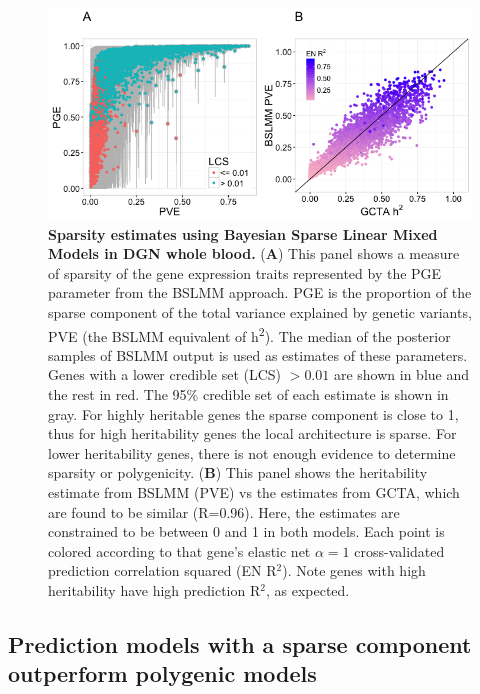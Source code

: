 \documentclass[10pt,letterpaper]{article}
\begin{document}
\begin{figure}[H]
\includegraphics[width=12cm]{Figures/Fig-DGN-BSLMM.png}
\caption{{\bf Sparsity estimates using Bayesian Sparse Linear Mixed Models in DGN whole blood.} 
(\textbf{A}) This panel shows a measure of sparsity of the gene expression traits represented by the PGE parameter from the BSLMM approach. PGE is the proportion of the sparse component of the total variance explained by genetic variants, PVE (the BSLMM equivalent of h\textsuperscript{2}). The median of the posterior samples of BSLMM output is used as estimates of these parameters.
Genes with a lower credible set (LCS) $>0.01$ are shown in blue and the rest in red. The 95\% credible set of each estimate is shown in gray. 
 For highly heritable genes the sparse component is close to 1, thus for high heritability genes the local architecture is sparse. For lower heritability genes, there is not enough evidence to determine sparsity or polygenicity. (\textbf{B}) This panel shows the heritability estimate from BSLMM (PVE) vs the estimates from GCTA, which are found to be similar (R=0.96). Here, the estimates are constrained to be between 0 and 1 in both models. Each point is colored according to that gene's elastic net \(\alpha=1\) cross-validated prediction correlation squared (EN R$^2$). Note genes with high heritability have high prediction R$^2$, as expected.
}
\label{fig-dgn-bslmm}
\end{figure}


\subsection*{Prediction models with a sparse component outperform polygenic models}\label{the-effect-of-local-genetic-variation-on-gene-expression-is-sparse-rather-than-polygenic}
\end{document}
